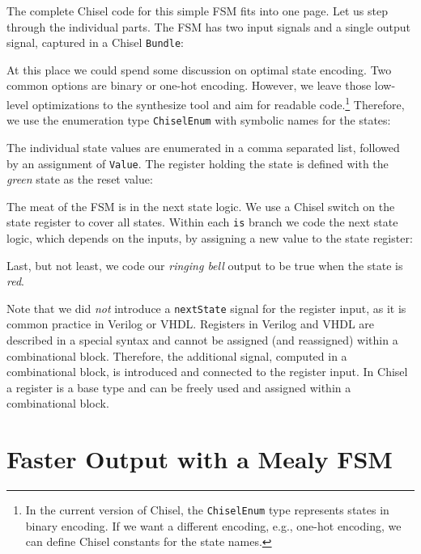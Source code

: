 \documentclass[%
    10pt,
    headinclude, footexclude,
    openright, %
    notitlepage,
    cleardoubleempty,
    headsepline,
    pointlessnumbers,
    bibtotoc, idxtotoc,
    ]{scrbook}
\newcommand{\code}[1]{{\small{\texttt{#1}}}}
\newcommand{\codefoot}[1]{{\footnotesize{\texttt{#1}}}}
\begin{document}
The complete Chisel code for this simple FSM fits into one page.
Let us step through the individual parts.
The FSM has two input signals and a single output signal, captured in a Chisel \code{Bundle}:
%


\noindent At this place we could spend some discussion on optimal state encoding. Two common options
are binary or one-hot encoding. However, we leave those low-level optimizations to
the synthesize tool and aim for readable code.\footnote{In the current version
of Chisel, the \codefoot{ChiselEnum} type represents states in binary encoding.
If we want a different encoding, e.g., one-hot encoding, we can define Chisel
constants for the state names.}
Therefore, we use the enumeration type \code{ChiselEnum} with symbolic names for the states:


\noindent The individual state values are enumerated in a comma separated list,
followed by an assignment of \code{Value}.
The register holding the state is defined with the \emph{green} state as the reset value:


\noindent The meat of the FSM is in the next state logic. We use a Chisel switch on the
state register to cover all states. Within each \code{is} branch we code the next state
logic, which depends on the inputs, by assigning a new value to the state register:


\noindent Last, but not least, we code our \emph{ringing bell} output to be true when
the state is \emph{red}.


Note that we did \emph{not} introduce a \code{nextState} signal for the register input,
as it is common practice in Verilog or VHDL.
Registers in Verilog and VHDL are described in a special syntax and cannot
be assigned (and reassigned) within a combinational block.
Therefore, the additional signal, computed in a combinational block, is
introduced and connected to the register input.
In Chisel a register is a base type and can be freely used and assigned
within a combinational block.

\section{Faster Output with a Mealy FSM}
\end{document}
